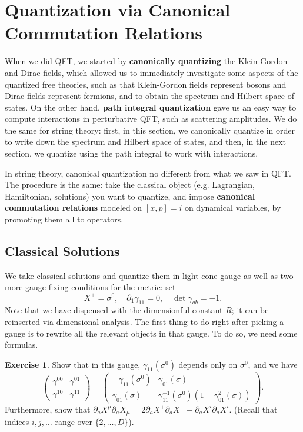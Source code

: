 \documentclass{report}
\theoremstyle{plain}
\theoremstyle{definition}
\newtheorem{exercise}{Exercise}[section]
\theoremstyle{remark}
\newcommand{\di}{\partial}
\begin{document}
\section{Quantization via Canonical Commutation Relations}

When we did QFT, we started by {\bf canonically quantizing} the
Klein-Gordon and Dirac fields, which allowed us to immediately
investigate some aspects of the quantized free theories, such as that
Klein-Gordon fields represent bosons and Dirac fields represent
fermions, and to obtain the spectrum and Hilbert space of states. On
the other hand, {\bf path integral quantization} gave us an easy way
to compute interactions in perturbative QFT, such as scattering
amplitudes. We do the same for string theory: first, in this section,
we canonically quantize in order to write down the spectrum and
Hilbert space of states, and then, in the next section, we quantize
using the path integral to work with interactions.

In string theory, canonical quantization no different from what we saw
in QFT. The procedure is the same: take the classical object (e.g.
Lagrangian, Hamiltonian, solutions) you want to quantize, and impose
{\bf canonical commutation relations} modeled on $[x, p] = i$ on
dynamical variables, by promoting them all to operators.

\subsection{Classical Solutions}

We take classical solutions and quantize them in light cone gauge as
well as two more gauge-fixing conditions for the metric: set
\[ X^+ = \sigma^0, \quad \di_1 \gamma_{11} = 0, \quad \det \gamma_{ab} = -1. \]
Note that we have dispensed with the dimensionful constant $R$; it can
be reinserted via dimensional analysis. The first thing to do right
after picking a gauge is to rewrite all the relevant objects in that
gauge. To do so, we need some formulas.

\begin{exercise}
  Show that in this gauge, $\gamma_{11}(\sigma^0)$ depends only on
  $\sigma^0$, and we have
  \[ \begin{pmatrix} \gamma^{00} & \gamma^{01} \\ \gamma^{10} & \gamma^{11} \end{pmatrix} = \begin{pmatrix} -\gamma_{11}(\sigma^0) & \gamma_{01}(\sigma) \\ \gamma_{01}(\sigma) & \gamma_{11}^{-1}(\sigma^0)(1 - \gamma_{01}^2(\sigma)) \end{pmatrix}. \]
  Furthermore, show that $\di_a X^\mu \di_a X_\mu = 2\di_a X^+ \di_a
  X^- - \di_a X^i \di_a X^i$. (Recall that indices $i, j, \ldots$
  range over $\{2, \ldots, D\}$).
\end{exercise}
\end{document}
